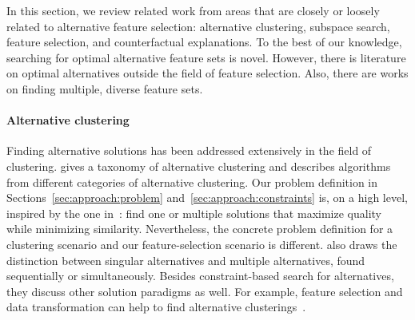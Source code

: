 \documentclass[conference]{IEEEtran}
\theoremstyle{definition}
\begin{document}
In this section, we review related work from areas that are closely or loosely related to alternative feature selection:
alternative clustering, subspace search, feature selection, and counterfactual explanations.
To the best of our knowledge, searching for optimal alternative feature sets is novel.
However, there is literature on optimal alternatives outside the field of feature selection.
Also, there are works on finding multiple, diverse feature sets.

\paragraph{Alternative clustering}

Finding alternative solutions has been addressed extensively in the field of clustering.
\cite{bailey2014alternative} gives a taxonomy of alternative clustering and describes algorithms from different categories of alternative clustering.
Our problem definition in Sections~\ref{sec:approach:problem} and~\ref{sec:approach:constraints} is, on a high level, inspired by the one in~\cite{bailey2014alternative}:
find one or multiple solutions that maximize quality while minimizing similarity.
Nevertheless, the concrete problem definition for a clustering scenario and our feature-selection scenario is different.
\cite{bailey2014alternative} also draws the distinction between singular alternatives and multiple alternatives, found sequentially or simultaneously.
Besides constraint-based search for alternatives, they discuss other solution paradigms as well.
For example, feature selection and data transformation can help to find alternative clusterings~\cite{tao2012novel}.

\end{document}
